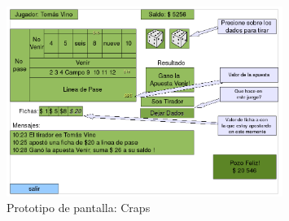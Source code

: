 	

	\begin{figure}[p!hbt]
		\centering
		\includegraphics[width=0.8\textwidth]{../img/PPCraps.png}
		\caption{Prototipo de pantalla: Craps }
		\label{fig:craps}
	\end{figure}


